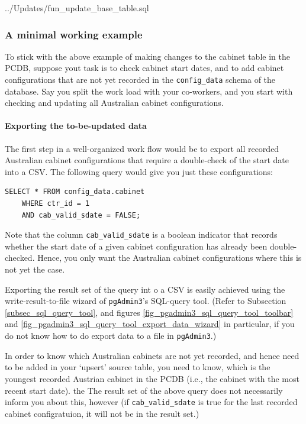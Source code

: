 %
{../Updates/fun_update_base_table.sql}

\subsubsection{A minimal working example}\label{par_upsert_minimal_working_example}

To stick with the above example of making changes to the cabinet table in the PCDB, suppose yout task is to check cabinet start dates, and to add cabinet configurations that are not yet recorded in the \texttt{config\_data} schema of the database.
Say you split the work load with your co-workers, and you start with checking and updating all Australian cabinet configurations.

\paragraph{Exporting the to-be-updated data}
The first step in a well-organized work flow would be to export all recorded Australian cabinet configurations that require a double-check of the start date into a CSV.
The following query would give you just these configurations: 
\begin{lstlisting}[language=postgreSQL]
SELECT * FROM config_data.cabinet 
	WHERE ctr_id = 1
	AND cab_valid_sdate = FALSE;
\end{lstlisting}
Note that the column \texttt{cab\_valid\_sdate} is a boolean indicator that records whether the start date of a given cabinet configuration has already been double-checked. Hence, you only want the Australian cabinet configurations where this is not yet the case.

Exporting the result set of the query int o a CSV is easily achieved using the write-result-to-file wizard of \texttt{pgAdmin3}'s SQL-query tool. (Refer to Subsection \ref{subsec_sql_query_tool}, and figures \ref{fig_pgadmin3_sql_query_tool_toolbar} and \ref{fig_pgadmin3_sql_query_tool_export_data_wizard} in particular, if you do not know how to do export data to a file in \texttt{pgAdmin3}.)

In order to know which Australian cabinets are not yet recorded, and hence need to be added in your `upsert' source table, you need to know, which is the youngest recorded Austrian cabinet in the PCDB (i.e., the cabinet with the most recent start date). 
the The result set of the above query does not necessarily inform you about this,  however (if \texttt{cab\_valid\_sdate} is true for the last recorded cabinet configratuion, it will not be in the result set.)

